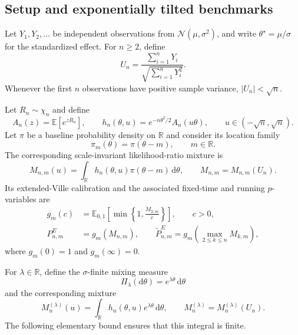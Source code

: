\documentclass[numsec,webpdf,modern,medium,namedate]{oup-authoring-template}
\theoremstyle{thmstyleone}
\theoremstyle{thmstyletwo}
\newcommand{\R}{\mathbb{R}}
\newcommand{\E}{\mathbb{E}}
\newcommand{\dd}{\mathrm{d}}
\begin{document}
\subsection{Setup and exponentially tilted benchmarks}
\label{supp:subsec:setup}

Let $Y_1,Y_2,\ldots$ be independent observations from
$\mathcal N(\mu,\sigma^2)$, and write
$\theta^\star=\mu/\sigma$ for the standardized effect.  For $n\geq2$,
define
\begin{equation}
\label{supp:eq:Un}
  U_n
  =
  \frac{\sum_{i=1}^nY_i}
       {\sqrt{\sum_{i=1}^nY_i^2}}.
\end{equation}
Whenever the first $n$ observations have positive sample variance,
$|U_n|<\sqrt n$.

Let $R_n\sim\chi_n$ and define
\begin{equation}
\label{supp:eq:hnu}
  A_n(z)=\E[e^{zR_n}],
  \qquad
  h_n(\theta,u)
  =
  e^{-n\theta^2/2}A_n(u\theta),
  \qquad
  u\in(-\sqrt n,\sqrt n).
\end{equation}
Let $\pi$ be a baseline probability density on $\R$ and consider its
location family
\begin{equation}
\label{supp:eq:shifted-prior}
  \pi_m(\theta)=\pi(\theta-m),
  \qquad m\in\R.
\end{equation}
The corresponding scale-invariant likelihood-ratio mixture is
\begin{equation}
\label{supp:eq:shifted-mixture}
  M_{n,m}(u)
  =
  \int_{\R}h_n(\theta,u)\pi(\theta-m)\,\dd\theta,
  \qquad
  M_{n,m}=M_{n,m}(U_n).
\end{equation}
Its extended-Ville calibration and the associated fixed-time and
running $p$-variables are
\begin{align}
  g_m(c)
  &={}
  \E_{0,1}\left[
    \min\left\{1,\frac{M_{2,m}}{c}\right\}
  \right],
  \qquad c>0,
  \label{supp:eq:gm}\\
  P_{n,m}^{E}
  &={}
  g_m(M_{n,m}),
  \qquad
  \widetilde P_{n,m}^{E}
  =
  g_m\left(\max_{2\leq k\leq n}M_{k,m}\right),
  \label{supp:eq:shifted-p-values}
\end{align}
where $g_m(0)=1$ and $g_m(\infty)=0$.

For $\lambda\in\R$, define the $\sigma$-finite mixing measure
\begin{equation}
\label{supp:eq:tilted-measure}
  \Pi_\lambda(\dd\theta)
  =
  e^{\lambda\theta}\,\dd\theta
\end{equation}
and the corresponding mixture
\begin{equation}
\label{supp:eq:tilted-mixture}
  M_n^{(\lambda)}(u)
  =
  \int_{\R}h_n(\theta,u)e^{\lambda\theta}\,\dd\theta,
  \qquad
  M_n^{(\lambda)}=M_n^{(\lambda)}(U_n).
\end{equation}
The following elementary bound ensures that this integral is finite.
\end{document}

